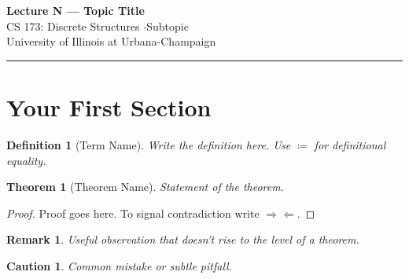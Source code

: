 \documentclass[11pt]{article}
\theoremstyle{defstyle}
\newtheorem{definition}{Definition}[section]
\theoremstyle{thmstyle}
\newtheorem{theorem}{Theorem}[section]
\theoremstyle{notstyle}
\newtheorem*{remark}{Remark}
\theoremstyle{cautionstyle}
\newtheorem*{caution}{Caution}
\newcommand{\defeq}{\coloneqq}          %
\newcommand{\contra}{\ensuremath{\Rightarrow\Leftarrow}}  %
\begin{document}
\begin{center}
  {\Large\bfseries Lecture N --- Topic Title}\\[4pt]          %
  {\normalsize CS 173: Discrete Structures \quad$\cdot$\quad Subtopic}\\[2pt]
  {\small\color{gray} University of Illinois at Urbana-Champaign}
\end{center}

\vspace{1em}
\hrule
\vspace{1.5em}

\section{Your First Section}

\begin{defbox}
\begin{definition}[Term Name]
  Write the definition here.  Use $\defeq$ for definitional equality.
\end{definition}
\end{defbox}

\begin{thmbox}
\begin{theorem}[Theorem Name]\label{thm:example}
  Statement of the theorem.
\end{theorem}
\end{thmbox}

\begin{proof}
  Proof goes here.  To signal contradiction write $\contra$.
\end{proof}

\begin{notebox}
\begin{remark}
  Useful observation that doesn't rise to the level of a theorem.
\end{remark}
\end{notebox}

\begin{cautionbox}
\begin{caution}
  Common mistake or subtle pitfall.
\end{caution}
\end{cautionbox}
\end{document}

